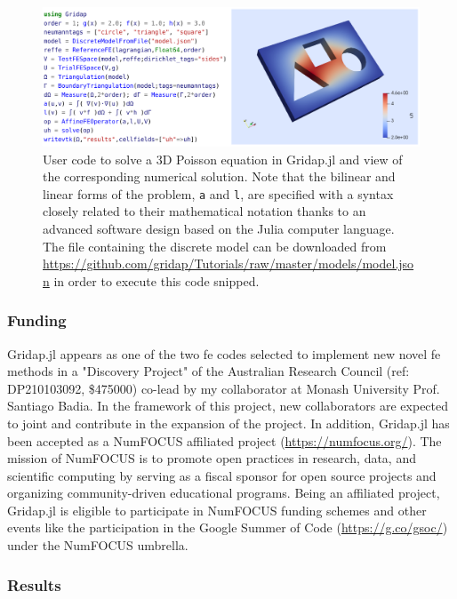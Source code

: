 \documentclass{article}
\begin{document}
\begin{figure}[ht!]
\includegraphics[width=\textwidth]{../_assets/fig11.png}
\caption{User code to solve a 3D Poisson equation in Gridap.jl and view of the corresponding numerical solution. Note that the bilinear and linear forms of the problem, \texttt{a} and \texttt{l}, are specified with a syntax closely related to their mathematical notation thanks to an advanced software design based on the Julia computer language. The file containing the discrete model can be downloaded from \url{https://github.com/gridap/Tutorials/raw/master/models/model.json} in order to execute this code snipped.} 
\label{fig:gridap-code}
\end{figure}

\subsubsection*{Funding}

Gridap.jl appears as one of the two  \ac{fe} codes selected to implement new novel \ac{fe} methods in a { "Discovery Project" of the Australian Research Council} (ref: DP210103092, \$475000) co-lead by my collaborator at Monash University Prof. Santiago Badia. In the framework of this project, new collaborators are expected to joint and contribute in the expansion of the project. In addition, Gridap.jl has been accepted as a {NumFOCUS affiliated project} (\url{https://numfocus.org/}). The mission of NumFOCUS is to promote open practices in research, data, and scientific computing by serving as a fiscal sponsor for open source projects and organizing community-driven educational programs. Being an affiliated project, Gridap.jl is eligible to participate in NumFOCUS funding schemes and other events like the participation in the Google Summer of Code (\url{https://g.co/gsoc/}) under the NumFOCUS umbrella.

\subsubsection*{Results}
\end{document}
